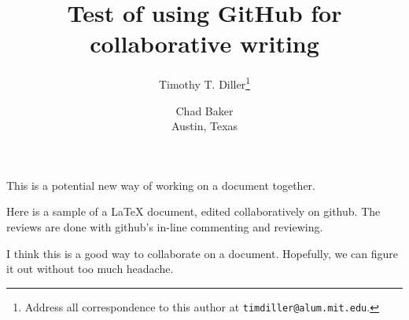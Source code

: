\documentclass[10pt,a4paper]{article}
\title{Test of using GitHub for collaborative writing}
\author{Timothy T. Diller\thanks{Address all correspondence to this
    author at \texttt{timdiller@alum.mit.edu}.} \and Chad Baker\\Austin, Texas}
\begin{document}
\maketitle
This is a potential new way of working on a document together.

Here is a sample of a \LaTeX{} document, edited collaboratively on github.
The reviews are done with github's in-line commenting and reviewing.

I think this is a good way to collaborate on a document. Hopefully, we
can figure it out without too much headache. 
\end{document}
